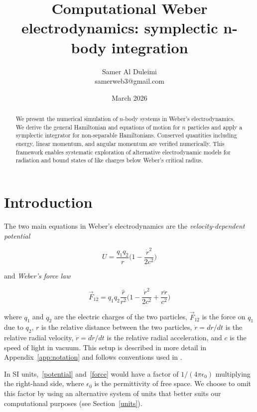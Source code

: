 \documentclass[12pt,a4paper]{article}
\title{Computational Weber electrodynamics: symplectic n-body integration}
\author{Samer Al Duleimi \\
\small samerweb3@gmail.com}
\date{March 2026}
\theoremstyle{definition}
\theoremstyle{remark}
\newcommand{\qq}{q_1 q_2}
\newcommand{\rdot}{\dot{r}}
\begin{document}
\maketitle

\begin{abstract}
    We present the numerical simulation of $n$-body systems in Weber's electrodynamics. We derive the general Hamiltonian and equations of motion for $n$ particles and apply a symplectic integrator for non-separable Hamiltonians. Conserved quantities including energy, linear momentum, and angular momentum are verified numerically. This framework enables systematic exploration of alternative electrodynamic models for radiation and bound states of like charges below Weber's critical radius.
\end{abstract}

\section{Introduction}

The two main equations in Weber's electrodynamics are the \textit{velocity-dependent potential}

\begin{equation}\label{potential}
    U = \frac{\qq}{r}\bigg(1 - \frac{\rdot^2}{2c^2}\bigg)
\end{equation}

and \textit{Weber's force law}

\begin{equation}\label{force}
    \vec{F}_{12} = \qq \frac{\hat{r}}{r^2}\bigg(1 - \frac{\rdot^2}{2c^2} + \frac{r\ddot{r}}{c^2}\bigg)
\end{equation}

where $q_1$ and $q_2$ are the electric charges of the two particles, $\vec{F}_{12}$ is the force on $q_1$ due to $q_2$, $r$ is the relative distance between the two particles, $\rdot = dr/dt$ is the relative radial velocity, $\ddot{r} = d\rdot/dt$ is the relative radial acceleration, and $c$ is the speed of light in vacuum. This setup is described in more detail in Appendix~\ref{app:notation} and follows conventions used in \citep{assis-weber}.

In SI units,~\eqref{potential} and~\eqref{force} would have a factor of $1/(4\pi \epsilon_0)$ multiplying the right-hand side, where $\epsilon_0$ is the permittivity of free space. We choose to omit this factor by using an alternative system of units that better suits our computational purposes (see Section~\ref{units}).
\end{document}
